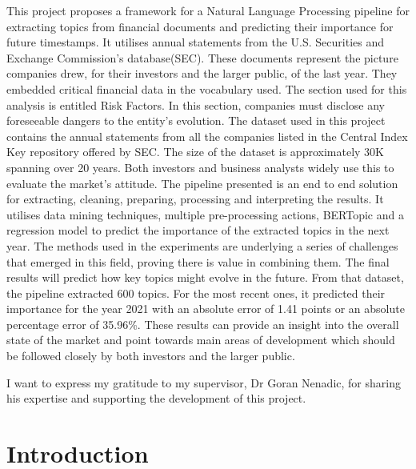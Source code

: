 \documentclass[12pt,MSc,a4paper,oneside]{muthesis}
\begin{document}
This project proposes a framework for a Natural Language Processing pipeline for extracting topics from financial documents and predicting their importance for future timestamps. It utilises annual statements from the U.S. Securities and Exchange Commission's database(SEC). These documents represent the picture companies drew, for their investors and the larger public, of the last year. They embedded critical financial data in the vocabulary used. The section used for this analysis is entitled Risk Factors. In this section, companies must disclose any foreseeable dangers to the entity's evolution. The dataset used in this project contains the annual statements from all the companies listed in the Central Index Key repository offered by SEC. The size of the dataset is approximately 30K spanning over 20 years. Both investors and business analysts widely use this to evaluate the market's attitude. 
The pipeline presented is an end to end solution for extracting, cleaning, preparing, processing and interpreting the results. It utilises data mining techniques, multiple pre-processing actions, BERTopic and a regression model to predict the importance of the extracted topics in the next year.
The methods used in the experiments are underlying a series of challenges that emerged in this field, proving there is value in combining them. The final results will predict how key topics might evolve in the future. From that dataset, the pipeline extracted 600 topics. For the most recent ones, it predicted their importance for the year 2021 with an absolute error of 1.41 points or an absolute percentage error of 35.96\%. These results can provide an insight into the overall state of the market and point towards main areas of development which should be followed closely by both investors and the larger public.

\afterabstract

I want to express my gratitude to my supervisor, Dr Goran Nenadic, for sharing his expertise and supporting the development of this project.

\afterpreface



\chapter{Introduction}
\end{document}
